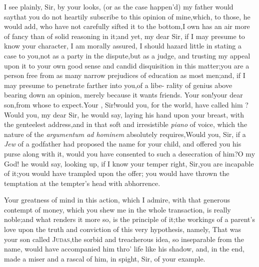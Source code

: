 \documentclass{article}
\begin{document}
I see plainly, Sir, by your looks, (or as the case happen’d) my
father would say\tsk  that you do not heartily subscribe to this
opinion of mine,\tsk  which, to those, he would add, who have not
carefully sifted it to the bottom,\tsk  I own has an air more of
fancy than of solid reasoning in it;\tsh  and yet, my dear
Sir, if I may presume to know your character, I am morally assured,
I should hazard little in stating a case to you,\tsk not as a party in
the dispute,\tsk  but as a judge, and trusting my appeal upon it
to your own good sense and candid disquisition in this
matter;\tsh  you are a person free from as many narrow
prejudices of education as most men;\tsk  and, if I may presume to
penetrate farther into you,\tsk  of a libe- rality of genius above
bearing down an opinion, merely because it wants friends. Your
son!\tsk  your dear son,\tsk  from whose  to expect.\tsk  Your ,
Sir!\tsk  would you, for the world, have called him\break
{}?\tsk  Would you, my dear Sir, he would say,
laying his hand upon your breast, with the genteelest
address,\tsk  and in that soft and irresistible \textit{piano} of
voice, which the nature of the \textit{argumentum ad hominem}
absolutely requires,\tsk  Would you, Sir, if a \textit{Jew} of a
godfather had proposed the name for your child, and offered you his
purse along with it, would you have consented to such a desecration
of him?\tsh  O my God! he would say, looking up, if I know
your temper right, Sir,\tsk  you are incapable of
it;\tsh  you would have trampled upon the offer;\tsk{} you
would have thrown the temptation at the tempter’s head with
abhorrence.

Your greatness of mind in this action, which I admire, with that
generous contempt of money, which you shew me in the whole
transaction, is really noble;\tsk\break  and what renders it more so, is
the principle of it;\tsk  the workings of a parent’s\break
love upon the truth and conviction of\break
this very hypothesis, namely, That
was your son called \textsc{Judas},\tsk  the sorbid and
treacherous idea, so inseparable from the name, would have
accompanied him\break
thro’ life like his shadow, and, in the\break
end, made a miser and a rascal of him,\break 
in spight, Sir, of your example.
\end{document}
